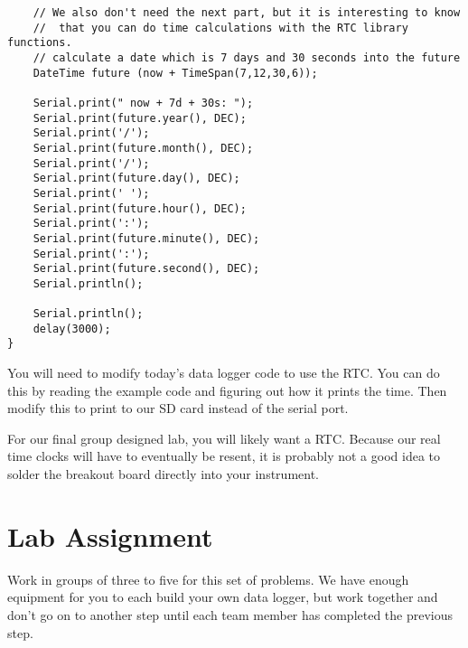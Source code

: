 \begin{verbatim}
    // We also don't need the next part, but it is interesting to know
    //  that you can do time calculations with the RTC library functions.
    // calculate a date which is 7 days and 30 seconds into the future
    DateTime future (now + TimeSpan(7,12,30,6));
    
    Serial.print(" now + 7d + 30s: ");
    Serial.print(future.year(), DEC);
    Serial.print('/');
    Serial.print(future.month(), DEC);
    Serial.print('/');
    Serial.print(future.day(), DEC);
    Serial.print(' ');
    Serial.print(future.hour(), DEC);
    Serial.print(':');
    Serial.print(future.minute(), DEC);
    Serial.print(':');
    Serial.print(future.second(), DEC);
    Serial.println();
    
    Serial.println();
    delay(3000);
}
\end{verbatim}

\bigskip

You will need to modify today's data logger code to use the RTC. You can do
this by reading the example code and figuring out how it prints the time.
Then modify this to print to our SD card instead of the serial port.

For our final group designed lab, you will likely want a RTC. Because our
real time clocks will have to eventually be resent, it is probably not a
good idea to solder the breakout board directly into your instrument.

\section{Lab Assignment}

Work in groups of three to five for this set of problems. We have enough
equipment for you to each build your own data logger, but work together and
don't go on to another step until each team member has completed the
previous step.

